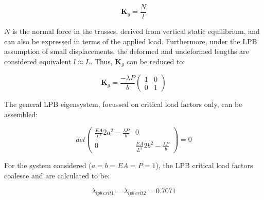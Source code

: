  \begin{equation} 
\mathbf{K}_g = 
\frac{N}{l}
\label{eqapp0_12}
\end{equation}

$N$ is the normal force in the trusses, derived from vertical static equilibrium, and can also be expressed in terms of the applied load. Furthermore, under the LPB assumption of small displacements, the deformed and undeformed lengths are considered equivalent $l \approx L$. Thus, $\mathbf{K}_g$ can be reduced to:

 \begin{equation} 
\mathbf{K}_g = 
\frac{-\lambda P}{b}
\begin{pmatrix}
1 & 0 \\
0 & 1
\end{pmatrix}
\label{eqapp0_13}
\end{equation}

The general LPB eigensystem, focussed on critical load factors only, can be assembled:

 \begin{equation} 
 det
\begin{pmatrix}
\frac{EA}{L^3} 2a^2 - \frac{\lambda P}{b} & 0 \\
0 &  \frac{EA}{L^3} 2b^2 - \frac{\lambda P}{b}
\end{pmatrix}
= 0
\label{eqapp0_14}
\end{equation}

For the system considered ($a=b=EA=P=1$), the LPB critical load factors coalesce and are calculated to be:

\begin{equation} 
\lambda_{lpb\ crit1} = 
\lambda_{lpb\ crit2} = 0.7071
\label{eqapp0_15}
\end{equation}